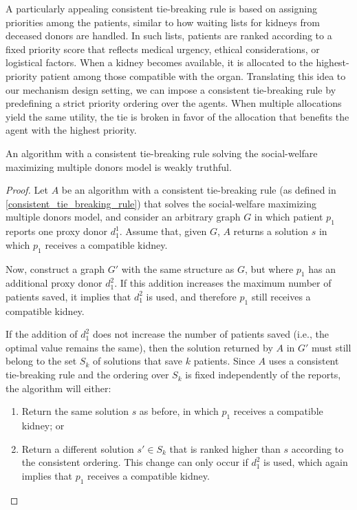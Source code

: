 A particularly appealing consistent tie-breaking rule is based on assigning priorities among the patients, similar to how waiting lists for kidneys from deceased donors are handled. In such lists, patients are ranked according to a fixed priority score that reflects medical urgency, ethical considerations, or logistical factors. When a kidney becomes available, it is allocated to the highest-priority patient among those compatible with the organ. Translating this idea to our mechanism design setting, we can impose a consistent tie-breaking rule by predefining a strict priority ordering over the agents. When multiple allocations yield the same utility, the tie is broken in favor of the allocation that benefits the agent with the highest priority.

\begin{lemma}
    An algorithm with a consistent tie-breaking rule solving the social-welfare maximizing multiple donors model is weakly truthful.
    \begin{proof}
    Let $A$ be an algorithm with a consistent tie-breaking rule (as defined in \autoref{consistent_tie_breaking_rule}) that solves the social-welfare maximizing multiple donors model, and consider an arbitrary graph $G$ in which patient $p_1$ reports one proxy donor $d_1^1$. Assume that, given $G$, $A$ returns a solution $s$ in which $p_1$ receives a compatible kidney.
    
    Now, construct a graph $G'$ with the same structure as $G$, but where $p_1$ has an additional proxy donor $d_1^2$. If this addition increases the maximum number of patients saved, it implies that $d_1^2$ is used, and therefore $p_1$ still receives a compatible kidney.
    
    If the addition of $d_1^2$ does not increase the number of patients saved (i.e., the optimal value remains the same), then the solution returned by $A$ in $G'$ must still belong to the set $S_k$ of solutions that save $k$ patients. Since $A$ uses a consistent tie-breaking rule and the ordering over $S_k$ is fixed independently of the reports, the algorithm will either:
    \begin{enumerate}
        \item Return the same solution $s$ as before, in which $p_1$ receives a compatible kidney; or
        \item Return a different solution $s' \in S_k$ that is ranked higher than $s$ according to the consistent ordering. This change can only occur if $d_1^2$ is used, which again implies that $p_1$ receives a compatible kidney.
    \end{enumerate}
    \end{proof}
\end{lemma}



